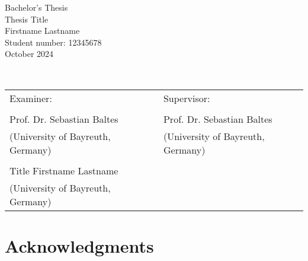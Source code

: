 \documentclass[
  pdftex,            %
  12pt,              %
  a4paper,           %
  parskip=relative,  %
  twoside,           %
  footinclude=false, %
  footheight=0mm,    %
  toc=bibliography,  %
  toc=listof         %
]{scrbook}           %
\theoremstyle{definitiontight}
\newcommand{\thesistype}{Bachelor's Thesis} %
\newcommand{\thesistitle}{Thesis Title}
\newcommand{\studentname}{Firstname Lastname}
\newcommand{\monthyear}{October 2024}
\newcommand{\studentnumber}{12345678}
\newcommand{\examiner}{Prof. Dr. Sebastian Baltes}
\newcommand{\secondexaminer}{Title Firstname Lastname}
\newcommand{\supervisor}{Prof. Dr. Sebastian Baltes} %
\begin{document}
\begin{center}
	\thesistype \\
	\vspace{11pt}
	{\Large\textsf{\thesistitle}}\\
	\vspace{15pt}
	\studentname \\
	{\scriptsize Student number: \studentnumber}\\
	\vspace{15pt}
	\monthyear \\
\end{center}

\vspace{10pt}
	
\begin{center}
	{\large{}}\\
\end{center}
\noindent \lipsum[1-2]

\vfill
	
\noindent
\begin{tabularx}{\textwidth}{l X l}
   Examiner:     & & Supervisor: \\
   \\
   \examiner         & & \supervisor \\
   {\scriptsize (University of Bayreuth, Germany)} & & {\scriptsize (University of Bayreuth, Germany)} \\
   \\
   \secondexaminer && \\
   {\scriptsize (University of Bayreuth, Germany)} & & 
\end{tabularx}

\newpage




\chapter*{Acknowledgments}

\lipsum[1-4]




\tableofcontents

\clearpage

\mainmatter
\end{document}

